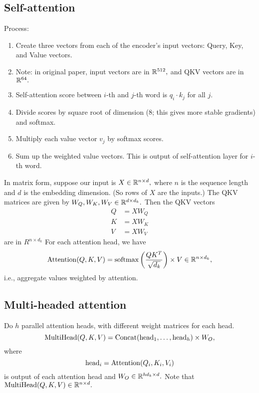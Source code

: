 \subsection{Self-attention}
Process:
\begin{enumerate}
\item Create three vectors from each of the encoder’s input vectors: Query, Key, and Value vectors.

\item Note: in original paper, input vectors are in $\mathbb{R}^{512},$ and QKV vectors are in $\mathbb{R}^{64}.$

\item Self-attention score between $i$-th and $j$-th word is $q_i \cdot k_j$ for all $j.$

\item Divide scores by square root of dimension (8; this gives more stable gradients) and softmax.

\item Multiply each value vector $v_j$ by softmax scores.

\item Sum up the weighted value vectors. This is output of self-attention layer for $i$-th word.
\end{enumerate}
In matrix form, suppose our input is $X \in \mathbb{R}^{n \times d},$ where $n$ is the sequence length and $d$ is the embedding dimension. (So rows of $X$ are the inputs.) The QKV matrices are given by $W_Q, W_K, W_V \in \mathbb{R}^{d \times d_k}.$ Then the QKV vectors
\begin{align*}
    Q &= XW_Q \\
    K &= XW_K \\
    V &= XW_V
\end{align*}
are in $R^{n \times d_k}$
For each attention head, we have
\[ \operatorname{Attention}(Q,K,V) = \operatorname{softmax}\left(\frac{QK^T}{\sqrt{d_k}}\right) \times V \in \mathbb{R}^{n \times d_k}, \]
i.e., aggregate values weighted by attention.

\subsection{Multi-headed attention}
Do $h$ parallel attention heads, with different weight matrices for each head.
\[ \operatorname{MultiHead}(Q, K, V) = \operatorname{Concat}(\operatorname{head}_1, \ldots, \operatorname{head}_h) \times W_O, \]
where
\[ \operatorname{head}_i = \operatorname{Attention}(Q_i, K_i, V_i) \]
is output of each attention head and $W_O \in \mathbb{R}^{hd_k \times d}.$ Note that $\operatorname{MultiHead}(Q, K, V) \in \mathbb{R}^{n \times d}.$ 

